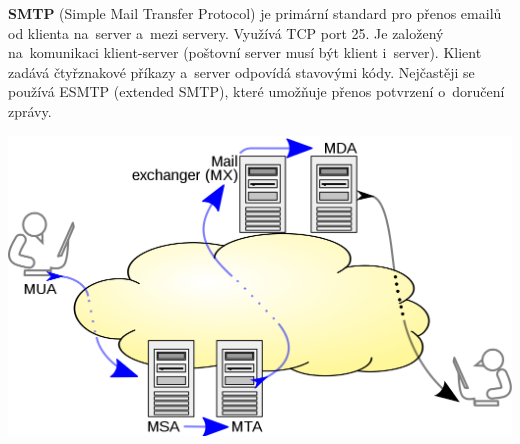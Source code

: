 \textbf{SMTP} (Simple Mail Transfer Protocol) je primární standard pro přenos emailů od klienta na~server a~mezi servery. Využívá TCP port 25. Je založený na~komunikaci klient-server (poštovní server musí být klient i~server). Klient zadává čtyřznakové příkazy a~server odpovídá stavovými kódy. Nejčastěji se používá ESMTP (extended SMTP), které umožňuje přenos potvrzení o~doručení zprávy.

\begin{center}
    \includegraphics[scale = 0.2]{images/emailcom.png}
\end{center}
